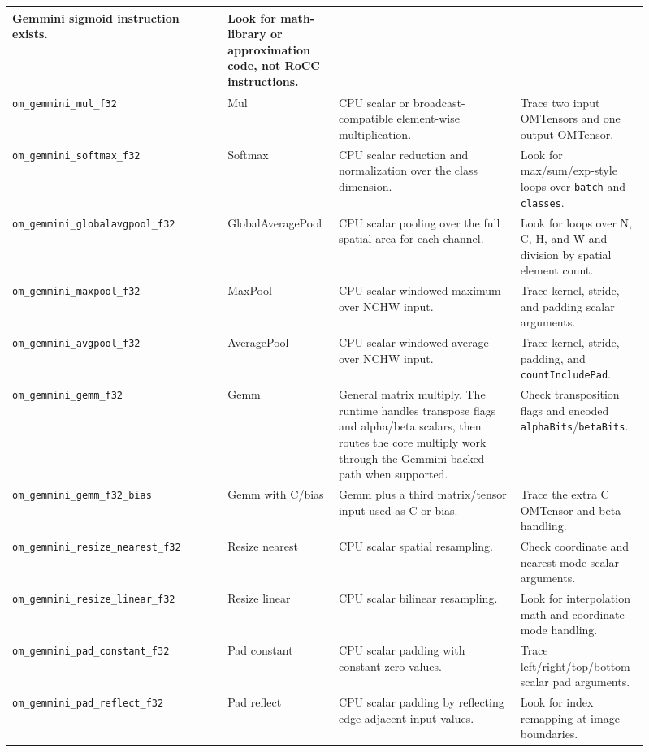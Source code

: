 \documentclass[12pt,a4paper]{article}
\begin{document}
\begin{longtable}{@{}p{0.32\linewidth}p{0.15\linewidth}p{0.27\linewidth}p{0.17\linewidth}@{}}
Gemmini sigmoid instruction exists. &
Look for math-library or approximation code, not RoCC instructions. \\
\midrule
\texttt{om\_gemmini\_mul\_f32} &
Mul &
CPU scalar or broadcast-compatible element-wise multiplication. &
Trace two input OMTensors and one output OMTensor. \\
\midrule
\texttt{om\_gemmini\_softmax\_f32} &
Softmax &
CPU scalar reduction and normalization over the class dimension. &
Look for max/sum/exp-style loops over \texttt{batch} and \texttt{classes}. \\
\midrule
\texttt{om\_gemmini\_globalavgpool\_f32} &
GlobalAveragePool &
CPU scalar pooling over the full spatial area for each channel. &
Look for loops over N, C, H, and W and division by spatial element count. \\
\midrule
\texttt{om\_gemmini\_maxpool\_f32} &
MaxPool &
CPU scalar windowed maximum over NCHW input. &
Trace kernel, stride, and padding scalar arguments. \\
\midrule
\texttt{om\_gemmini\_avgpool\_f32} &
AveragePool &
CPU scalar windowed average over NCHW input. &
Trace kernel, stride, padding, and \texttt{countIncludePad}. \\
\midrule
\texttt{om\_gemmini\_gemm\_f32} &
Gemm &
General matrix multiply. The runtime handles transpose flags and alpha/beta
scalars, then routes the core multiply work through the Gemmini-backed path when
supported. &
Check transposition flags and encoded \texttt{alphaBits}/\texttt{betaBits}. \\
\midrule
\texttt{om\_gemmini\_gemm\_f32\_bias} &
Gemm with C/bias &
Gemm plus a third matrix/tensor input used as C or bias. &
Trace the extra C OMTensor and beta handling. \\
\midrule
\texttt{om\_gemmini\_resize\_nearest\_f32} &
Resize nearest &
CPU scalar spatial resampling. &
Check coordinate and nearest-mode scalar arguments. \\
\midrule
\texttt{om\_gemmini\_resize\_linear\_f32} &
Resize linear &
CPU scalar bilinear resampling. &
Look for interpolation math and coordinate-mode handling. \\
\midrule
\texttt{om\_gemmini\_pad\_constant\_f32} &
Pad constant &
CPU scalar padding with constant zero values. &
Trace left/right/top/bottom scalar pad arguments. \\
\midrule
\texttt{om\_gemmini\_pad\_reflect\_f32} &
Pad reflect &
CPU scalar padding by reflecting edge-adjacent input values. &
Look for index remapping at image boundaries. \\

\end{longtable}
\end{document}
